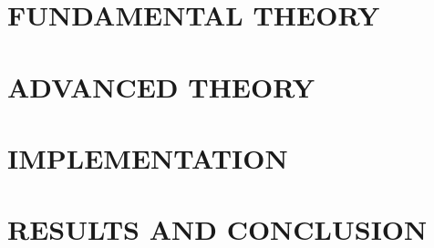 
	
    
    
    
    \part{FUNDAMENTAL THEORY}
    
    
    
    
    \part{ADVANCED THEORY}
    
    
    
    
    \part{IMPLEMENTATION}
    
    
    
    
    \part{RESULTS AND CONCLUSION}
    
    
    
    \appendix
    
    
    
    \newpage
    \nocite{*}
    \printbibliography

